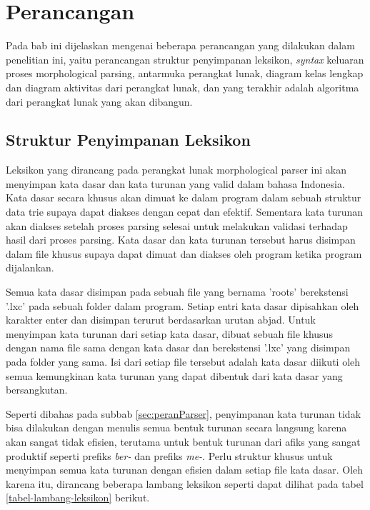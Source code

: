 \chapter{Perancangan}
\label{chap:perancangan}

Pada bab ini dijelaskan mengenai beberapa perancangan yang dilakukan dalam penelitian ini, yaitu perancangan struktur penyimpanan leksikon, \textit{syntax} keluaran proses morphological parsing, antarmuka perangkat lunak, diagram kelas lengkap dan diagram aktivitas dari perangkat lunak, dan yang terakhir adalah algoritma dari perangkat lunak yang akan dibangun.

\section{Struktur Penyimpanan Leksikon}
\label{sec:strukturPenyimpananLeksikon}

Leksikon yang dirancang pada perangkat lunak morphological parser ini akan menyimpan kata dasar dan kata turunan yang valid dalam bahasa Indonesia. Kata dasar secara khusus akan dimuat ke dalam program dalam sebuah struktur data trie supaya dapat diakses dengan cepat dan efektif. Sementara kata turunan akan diakses setelah proses parsing selesai untuk melakukan validasi terhadap hasil dari proses parsing. Kata dasar dan kata turunan tersebut harus disimpan dalam file khusus supaya dapat dimuat dan diakses oleh program ketika program dijalankan.

Semua kata dasar disimpan pada sebuah file yang bernama 'roots' berekstensi '.lxc' pada sebuah folder dalam program. Setiap entri kata dasar dipisahkan oleh karakter enter dan disimpan terurut berdasarkan urutan abjad. Untuk menyimpan kata turunan dari setiap kata dasar, dibuat sebuah file khusus dengan nama file sama dengan kata dasar dan berekstensi '.lxc' yang disimpan pada folder yang sama. Isi dari setiap file tersebut adalah kata dasar diikuti oleh semua kemungkinan kata turunan yang dapat dibentuk dari kata dasar yang bersangkutan.

Seperti dibahas pada subbab \ref{sec:peranParser}, penyimpanan kata turunan tidak bisa dilakukan dengan menulis semua bentuk turunan secara langsung karena akan sangat tidak efisien, terutama untuk bentuk turunan dari afiks yang sangat produktif seperti prefiks \textit{ber-} dan prefiks \textit{me-}. Perlu struktur khusus untuk menyimpan semua kata turunan dengan efisien dalam setiap file kata dasar. Oleh karena itu, dirancang beberapa lambang leksikon seperti dapat dilihat pada tabel \ref{tabel-lambang-leksikon} berikut.

